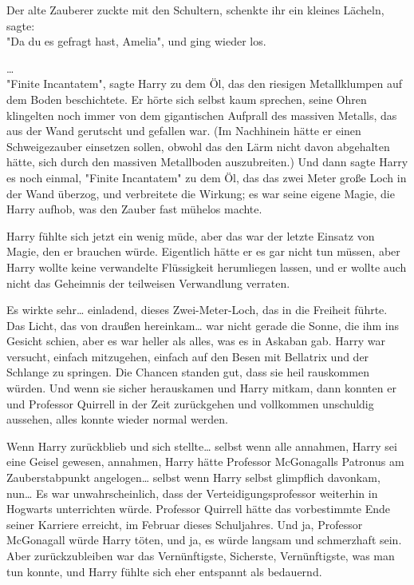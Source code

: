 {Der alte Zauberer zuckte mit den Schultern, schenkte ihr ein kleines Lächeln, sagte:\\ "Da du es gefragt hast, Amelia", und ging wieder los.

…\\ "Finite Incantatem", sagte Harry zu dem Öl, das den riesigen Metallklumpen auf dem Boden beschichtete. Er hörte sich selbst kaum sprechen, seine Ohren klingelten noch immer von dem gigantischen Aufprall des massiven Metalls, das aus der Wand gerutscht und gefallen war. (Im Nachhinein hätte er einen Schweigezauber einsetzen sollen, obwohl das den Lärm nicht davon abgehalten hätte, sich durch den massiven Metallboden auszubreiten.) Und dann sagte Harry es noch einmal, "Finite Incantatem" zu dem Öl, das das zwei Meter große Loch in der Wand überzog, und verbreitete die Wirkung; es war seine eigene Magie, die Harry aufhob, was den Zauber fast mühelos machte.

Harry fühlte sich jetzt ein wenig müde, aber das war der letzte Einsatz von Magie, den er brauchen würde. Eigentlich hätte er es gar nicht tun müssen, aber Harry wollte keine verwandelte Flüssigkeit herumliegen lassen, und er wollte auch nicht das Geheimnis der teilweisen Verwandlung verraten.

Es wirkte sehr… einladend, dieses Zwei-Meter-Loch, das in die Freiheit führte. Das Licht, das von draußen hereinkam… war nicht gerade die Sonne, die ihm ins Gesicht schien, aber es war heller als alles, was es in Askaban gab. Harry war versucht, einfach mitzugehen, einfach auf den Besen mit Bellatrix und der Schlange zu springen. Die Chancen standen gut, dass sie heil rauskommen würden. Und wenn sie sicher herauskamen und Harry mitkam, dann konnten er und Professor Quirrell in der Zeit zurückgehen und vollkommen unschuldig aussehen, alles konnte wieder normal werden.

Wenn Harry zurückblieb und sich stellte… selbst wenn alle annahmen, Harry sei eine Geisel gewesen, annahmen, Harry hätte Professor McGonagalls Patronus am Zauberstabpunkt angelogen… selbst wenn Harry selbst glimpflich davonkam, nun… Es war unwahrscheinlich, dass der Verteidigungsprofessor weiterhin in Hogwarts unterrichten würde. Professor Quirrell hätte das vorbestimmte Ende seiner Karriere erreicht, im Februar dieses Schuljahres. Und ja, Professor McGonagall würde Harry töten, und ja, es würde langsam und schmerzhaft sein. Aber zurückzubleiben war das Vernünftigste, Sicherste, Vernünftigste, was man tun konnte, und Harry fühlte sich eher entspannt als bedauernd.

}
